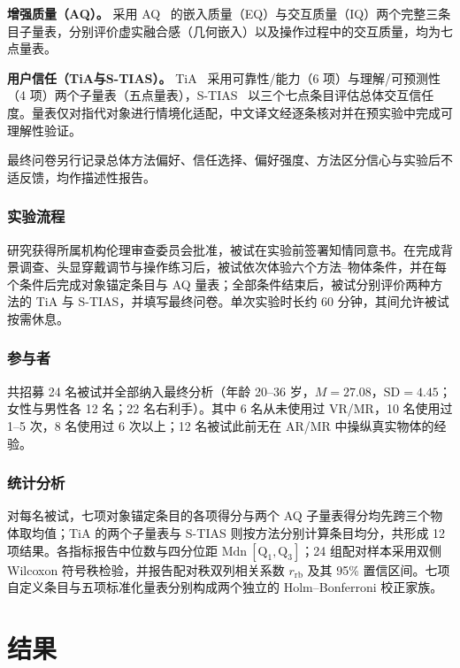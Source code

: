 \documentclass[review]{vgtc}
\begin{document}
\textbf{增强质量（AQ）。}
采用 AQ~\cite{aq2026} 的嵌入质量（EQ）与交互质量（IQ）两个完整三条目子量表，分别评价虚实融合感（几何嵌入）以及操作过程中的交互质量，均为七点量表。

\textbf{用户信任（TiA与S-TIAS）。}
TiA~\cite{tia2019} 采用可靠性/能力（6 项）与理解/可预测性（4 项）两个子量表（五点量表），S-TIAS~\cite{stias2025} 以三个七点条目评估总体交互信任度。量表仅对指代对象进行情境化适配，中文译文经逐条核对并在预实验中完成可理解性验证。

最终问卷另行记录总体方法偏好、信任选择、偏好强度、方法区分信心与实验后不适反馈，均作描述性报告。

\subsubsection{实验流程}

研究获得所属机构伦理审查委员会批准，被试在实验前签署知情同意书。在完成背景调查、头显穿戴调节与操作练习后，被试依次体验六个方法--物体条件，并在每个条件后完成对象锚定条目与 AQ 量表；全部条件结束后，被试分别评价两种方法的 TiA 与 S-TIAS，并填写最终问卷。单次实验时长约 60 分钟，其间允许被试按需休息。

\subsubsection{参与者}

共招募 24 名被试并全部纳入最终分析（年龄 20--36 岁，$M=27.08$，$\mathrm{SD}=4.45$；女性与男性各 12 名；22 名右利手）。其中 6 名从未使用过 VR/MR，10 名使用过 1--5 次，8 名使用过 6 次以上；12 名被试此前无在 AR/MR 中操纵真实物体的经验。

\subsubsection{统计分析}

对每名被试，七项对象锚定条目的各项得分与两个 AQ 子量表得分均先跨三个物体取均值；TiA 的两个子量表与 S-TIAS 则按方法分别计算条目均分，共形成 12 项结果。各指标报告中位数与四分位距 $\mathrm{Mdn}\ [\mathrm{Q}_1, \mathrm{Q}_3]$；24 组配对样本采用双侧 Wilcoxon 符号秩检验，并报告配对秩双列相关系数 $r_{\mathrm{rb}}$ 及其 95\% 置信区间。七项自定义条目与五项标准化量表分别构成两个独立的 Holm--Bonferroni 校正家族。

\section{结果}\label{sec:results}
\end{document}
